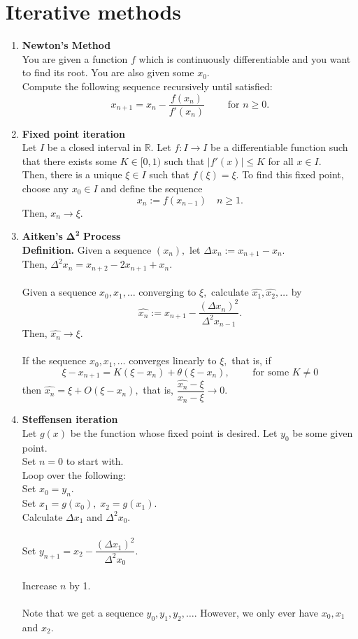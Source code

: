 \documentclass{article}
\begin{document}
\section{Iterative methods}
\begin{enumerate} 
	\itemsep1em
	\item \textbf{Newton's Method} \\
	You are given a function $f$ which is continuously differentiable and you want to find its root. You are also given some $x_0.$\\
	Compute the following sequence recursively until satisfied:
	\[x_{n+1} = x_n - \frac{f(x_n)}{f'(x_n)} \qquad \text{ for } n \ge 0.\]
	\item \textbf{Fixed point iteration}\\
	Let $I$ be a closed interval in $\mathbb{R}.$ Let $f:I\to I$ be a differentiable function such that there exists some $K \in [0, 1)$ such that $|f'(x)| \le K$ for all $x \in I.$\\
	Then, there is a unique $\xi \in I$ such that $f(\xi) = \xi.$ To find this fixed point, choose any $x_0 \in I$ and define the sequence
	\[x_n := f(x_{n-1}) \quad n \ge 1.\]
	Then, $x_n \to \xi.$
	\item \textbf{Aitken's} $\mathbf{\Delta^2}$ \textbf{Process}\\
	\textbf{Definition.} Given a sequence $(x_n),$ let $\Delta x_n := x_{n+1} - x_n.$\\
	Then, $\Delta^2x_n = x_{n+2} - 2x_{n+1} + x_n.$\\~\\
	
	Given a sequence $x_0, x_1, \ldots$ converging to $\xi,$ calculate $\widehat{x_1}, \widehat{x_2}, \ldots$ by
	\[\widehat{x_n} := x_{n+1} - \frac{(\Delta x_n)^2}{\Delta^2x_{n-1}}.\]
	Then, $\widehat{x_n} \to \xi.$\\~\\
	If the sequence $x_0, x_1, \ldots$ converges linearly to $\xi,$ that is, if
	\[\xi - x_{n+1} = K(\xi - x_n) + \theta(\xi - x_n), \qquad \text{ for some } K \neq 0\]
	then $\widehat{x_n} = \xi + O(\xi - x_n),$ that is, $\dfrac{\widehat{x_n} - \xi}{x_n - \xi} \to 0.$
	\item \textbf{Steffensen iteration}\\
	Let $g(x)$ be the function whose fixed point is desired. Let $y_0$ be some given point.\\
	Set $n = 0$ to start with.\\
	Loop over the following:\\
	Set $x_0 = y_n.$\\
	Set $x_1 = g(x_0),\;x_2 = g(x_1).$\\
	Calculate $\Delta x_1$ and $\Delta^2x_0.$\\~\\
	Set $y_{n+1} = x_2 - \dfrac{(\Delta x_1)^2}{\Delta^2x_0}.$\\~\\
	Increase $n$ by 1.\\~\\
	Note that we get a sequence $y_0, y_1, y_2, \ldots.$ However, we only ever have $x_0, x_1$ and $x_2.$
\end{enumerate}
\end{document}
